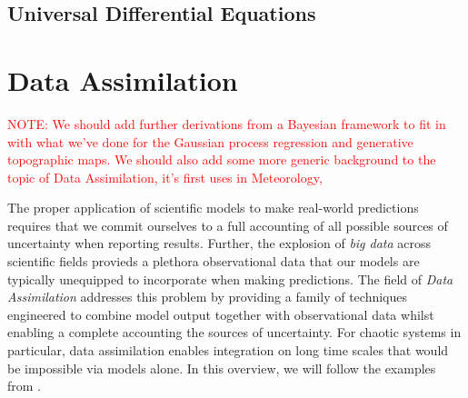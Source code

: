 \subsection{Universal Differential Equations}







\section{Data Assimilation}

\textcolor{red}{NOTE: We should add further derivations from a Bayesian framework to fit in with what we've done for the Gaussian process regression and generative topographic maps. We should also add some more generic background to the topic of Data Assimilation, it's first uses in Meteorology, }


The proper application of scientific models to make real-world predictions requires that we commit ourselves to a full accounting of all possible sources of uncertainty when reporting results. Further, the explosion of \textit{big data} across scientific fields provieds a plethora observational data that our models are typically unequipped to incorporate when making predictions. The field of \textit{Data Assimilation} addresses this problem by providing a family of techniques engineered to combine model output together with observational data whilst enabling a complete accounting the sources of uncertainty. For chaotic systems in particular, data assimilation enables integration on long time scales that would be impossible via models alone. In this overview, we will follow the examples from \cite{pyda}.

